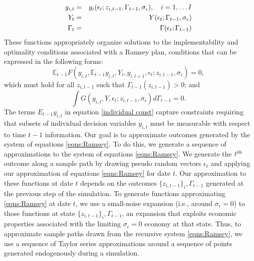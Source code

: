 \documentclass[thmsb,11pt]{article}
\newcommand{\EE}{\mathbb E}
\begin{document}
\begin{eqnarray}\label{eqns:Ramsey}
y_{i,t}& =&y_i(\epsilon_t;z_{i,t-1},\Gamma_{t-1},\sigma_{\epsilon}), \quad i=1,\ldots I \cr
Y_{t} & =& Y(\epsilon_t;\Gamma_{t-1},\sigma_{\epsilon}) \cr
\Gamma_{t} & = & \Gamma(\epsilon_t;\Gamma_{t-1})
\end{eqnarray}
These functions appropriately
organize solutions to the implementability and optimality conditions associated with a Ramsey plan,  conditions
 that can be expressed in the following forms:
	\begin{equation}
	\label{individual const}
			\EE_{t-1}F(y_{i,t}, \EE_{t-1} y_{i,t}, Y_t, y_{i,t+1} ,\epsilon_t; z_{i,t-1},\sigma_\epsilon) = 0,
	\end{equation}
	which must hold for all $z_{i,t-1}$ such that $\Gamma_{t-1}(z_{i,t-1})>0$; and
		\begin{equation}
	\label{aggregate const}
		\int G(y_{i,t},Y,\epsilon_t;z_{i,t-1},\sigma_\epsilon) d\Gamma_{t-1}= 0	.
	\end{equation}
	The terms $E_{t-1}y_{i,t}$ in equation \eqref{individual const}  capture  constraints requiring  that  subsets of individual decision variables $y_{i,t}$ must be  measurable with respect to time $t-1$ information.
Our goal is to approximate outcomes generated by the system of equations \eqref{eqns:Ramsey}.  To do this, we
generate a sequence of approximations to the system of equations \eqref{eqns:Ramsey}. We generate the $t\textsuperscript{th}$ outcome along a sample path
by drawing pseudo random vectors $\epsilon_t$ and applying our approximation of equations \eqref{eqns:Ramsey}  for date $t$.
Our approximation to these functions at date $t$ depends on the outcomes $\{z_{i,t-1}\}_i, \Gamma_{t-1}$ generated
at the previous step of the simulation.  To generate functions approximating \eqref{eqns:Ramsey} at date $t$, we use a small-noise
expansion (i.e., around $\sigma_{\epsilon}=0$) to those functions at state $\{z_{i,t-1}\}_i, \Gamma_{t-1}$, an expansion
 that exploits economic properties associated with the limiting $\sigma_\epsilon =0$ economy at that state.
 Thus, to approximate sample paths drawn from the recursive system \eqref{eqns:Ramsey}, we use a sequence of Taylor series approximations around a sequence of points generated
endogenously during a simulation.
\end{document}
